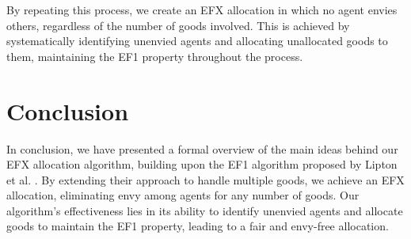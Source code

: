 \documentclass{article}
\begin{document}
By repeating this process, we create an EFX allocation in which no agent envies others, regardless of the number of goods involved. This is achieved by systematically identifying unenvied agents and allocating unallocated goods to them, maintaining the EF1 property throughout the process.

\section{Conclusion}

In conclusion, we have presented a formal overview of the main ideas behind our EFX allocation algorithm, building upon the EF1 algorithm proposed by Lipton et al. \cite{10.1145/988772.988792}. By extending their approach to handle multiple goods, we achieve an EFX allocation, eliminating envy among agents for any number of goods. Our algorithm's effectiveness lies in its ability to identify unenvied agents and allocate goods to maintain the EF1 property, leading to a fair and envy-free allocation.


\end{document}
